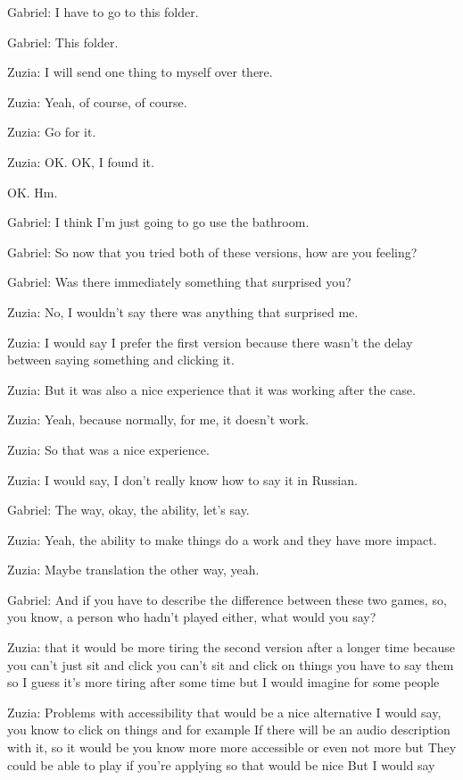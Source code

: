 Gabriel: I have to go to this folder.

Gabriel: This folder.

Zuzia: I will send one thing to myself over there.

Zuzia: Yeah, of course, of course.

Zuzia: Go for it.

Zuzia: OK. OK, I found it.

OK. Hm.

Gabriel: I think I'm just going to go use the bathroom.

Gabriel: So now that you tried both of these versions, how are you feeling?

Gabriel: Was there immediately something that surprised you?

Zuzia: No, I wouldn't say there was anything that surprised me.

Zuzia: I would say I prefer the first version because there wasn't the delay between saying something and clicking it.

Zuzia: But it was also a nice experience that it was working after the case.

Zuzia: Yeah, because normally, for me, it doesn't work.

Zuzia: So that was a nice experience.

Zuzia: I would say, I don't really know how to say it in Russian.

Gabriel: The way, okay, the ability, let's say.

Zuzia: Yeah, the ability to make things do a work and they have more impact.

Zuzia: Maybe translation the other way, yeah.

Gabriel: And if you have to describe the difference between these two games, so, you know, a person who hadn't played either, what would you say?

Zuzia: that it would be more tiring the second version after a longer time because you can't just sit and click you can't sit and click on things you have to say them so I guess it's more tiring after some time but I would imagine for some people

Zuzia: Problems with accessibility that would be a nice alternative I would say, you know to click on things and for example If there will be an audio description with it, so it would be you know more more accessible or even not more but They could be able to play if you're applying so that would be nice But I would say

